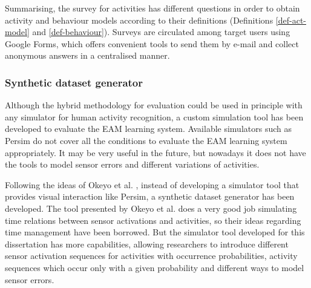 Summarising, the survey for activities has different questions in order to obtain activity and behaviour models according to their definitions (Definitions \ref{def-act-model} and \ref{def-behaviour}). Surveys are circulated among target users using Google Forms, which offers convenient tools to send them by e-mail and collect anonymous answers in a centralised manner.



\subsubsection{Synthetic dataset generator}
\label{subsubsec:evaluation:synthetic}
\begin{comment}
 - Explain the script: sensor activation patterns, activity patterns (sequences and alterations), sensor positive noise
 - Explain probabilistic sensor modelling
 - Explain probabilistic time lapses
 - Show output examples and give numbers
\end{comment}
Although the hybrid methodology for evaluation could be used in principle with any simulator for human activity recognition, a custom simulation tool has been developed to evaluate the EAM learning system. Available simulators such as Persim do not cover all the conditions to evaluate the EAM learning system appropriately. It may be very useful in the future, but nowadays it does not have the tools to model sensor errors and different variations of activities.

Following the ideas of Okeyo et al. \cite{Okeyo2012a}, instead of developing a simulator tool that provides visual interaction like Persim, a synthetic dataset generator has been developed. The tool presented by Okeyo et al. does a very good job simulating time relations between sensor activations and activities, so their ideas regarding time management have been borrowed. But the simulator tool developed for this dissertation has more capabilities, allowing researchers to introduce different sensor activation sequences for activities with occurrence probabilities, activity sequences which occur only with a given probability and different ways to model sensor errors.

